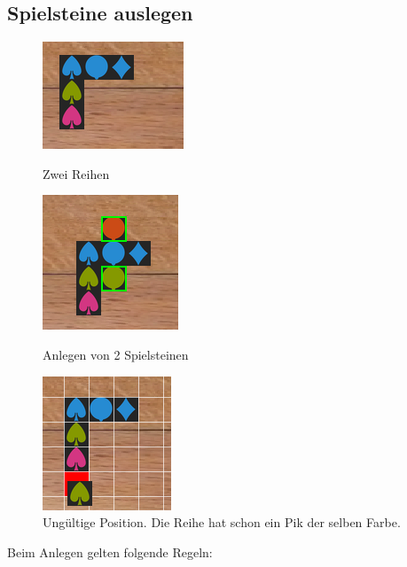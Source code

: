 \documentclass[a4paper, ngerman]{scrartcl}
\begin{document}
\subsection{Spielsteine auslegen}
\begin{figure}
	\centering
	\begin{subfigures}
		\includegraphics[scale = 0.7]{images/anlegen01}
		\caption{Zwei Reihen}
		\label{fig:Anlegen01}
		
		\includegraphics[scale = 0.7]{images/anlegen04}
		\caption{Anlegen von 2 Spielsteinen}
		\label{fig:Anlegen02}
		
		\includegraphics[scale = 0.7]{images/anlegen02}
		\caption{Ungültige Position. Die Reihe hat schon ein Pik der selben Farbe.}
		\label{fig:Anlegen03}
	\end{subfigures}	
\end{figure}
Beim Anlegen gelten folgende Regeln:
\end{document}
